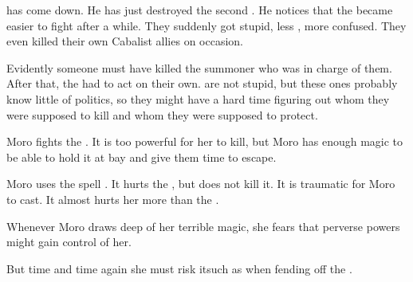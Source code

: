 \begin{comment}
  \section{Psyrex comes down}
\end{comment}
\new
\Psyrex has come down. 
He has just destroyed the second \bane. 
He notices that the \banes became easier to fight after a while. 
They suddenly got stupid, less \coordinated, more confused.
They even killed their own Cabalist allies on occasion. 

Evidently someone must have killed the summoner who was in charge of them.
After that, the \banes had to act on their own. 
\Banes are not stupid, but these ones probably know little of \Malcuric politics, so they might have a hard time figuring out whom they were supposed to kill and whom they were supposed to protect. 





\begin{comment}
  \section{Moro saved by Psyrex}
\end{comment}
\new
Moro fights the \bane. 
It is too powerful for her to kill, but Moro has enough magic to be able to hold it at bay and give them time to escape. 

Moro uses the spell . 
It hurts the \bane, but does not kill it. 
It is traumatic for Moro to cast. 
It almost hurts her more than the \bane. 

Whenever Moro draws deep of her terrible magic, she fears that perverse powers might gain control of her. 


But time and time again she must risk it\dash such as when fending off the \bane. 


